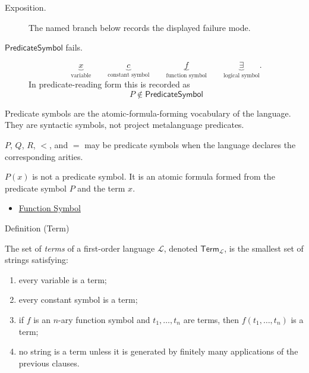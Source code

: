 \begin{remark*}
\begin{description}
  \item[Exposition.] The named branch below records the displayed failure mode.
\item[\(\mathsf{PredicateSymbol}\) fails.] \[
\underbrace{x}_{\text{variable}}
\qquad
\underbrace{c}_{\text{constant symbol}}
\qquad
\underbrace{f}_{\text{function symbol}}
\qquad
\underbrace{\exists}_{\text{logical symbol}}.
\]
  In predicate-reading form this is recorded as
  \[
    P\notin\mathsf{PredicateSymbol}
  \]
\end{description}
\end{remark*}

\begin{remark*}[Interpretation]
Predicate symbols are the atomic-formula-forming vocabulary of the language.
They are syntactic symbols, not project metalanguage predicates.
\end{remark*}

\begin{remark*}[Examples]
\(P\), \(Q\), \(R\), \(<\), and \(=\) may be predicate symbols when the language
declares the corresponding arities.
\end{remark*}

\begin{remark*}
\(P(x)\) is not a predicate symbol. It is an atomic formula formed from the
predicate symbol \(P\) and the term \(x\).
\end{remark*}

\begin{dependencies}
\begin{itemize}
  \item \hyperref[def:function-symbol]{Function Symbol}
\end{itemize}
\end{dependencies}

\begin{definitionbox}{Definition (Term)}
\begin{definition}[Term]
\label{def:term}
The set of \emph{terms} of a first-order language \(\mathcal L\), denoted
\(\mathsf{Term}_{\mathcal L}\), is the smallest set of strings satisfying:
\begin{enumerate}
\item every variable is a term;
\item every constant symbol is a term;
\item if \(f\) is an \(n\)-ary function symbol and
      \(t_1,\ldots,t_n\) are terms, then \(f(t_1,\ldots,t_n)\) is a term;
\item no string is a term unless it is generated by finitely many applications
      of the previous clauses.
\end{enumerate}
\end{definition}
\end{definitionbox}

